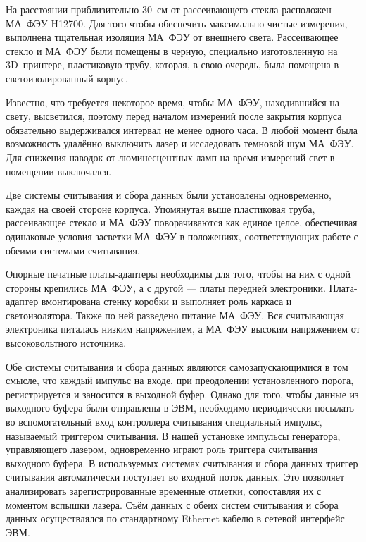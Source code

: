 На расстоянии приблизительно 30~см от рассеивающего стекла расположен МА~ФЭУ H12700. Для того чтобы обеспечить максимально чистые измерения, выполнена тщательная изоляция МА~ФЭУ от внешнего света. Рассеивающее стекло и МА~ФЭУ были помещены в черную, специально изготовленную на 3D~принтере, пластиковую трубу, которая, в свою очередь, была помещена в светоизолированный корпус.

Известно, что требуется некоторое время, чтобы МА~ФЭУ, находившийся на свету, высветился, поэтому перед началом измерений после закрытия корпуса обязательно выдерживался интервал не менее одного часа. В любой момент была возможность удалённо выключить лазер и исследовать темновой шум МА~ФЭУ. Для снижения наводок от люминесцентных ламп на время измерений свет в помещении выключался.

Две системы считывания и сбора данных были установлены одновременно, каждая на своей стороне корпуса. Упомянутая выше пластиковая труба, рассеивающее стекло и МА~ФЭУ поворачиваются как единое целое, обеспечивая одинаковые условия засветки МА~ФЭУ в положениях, соответствующих работе с обеими системами считывания.

Опорные печатные платы-адаптеры необходимы для того, чтобы на них с одной стороны крепились МА~ФЭУ, а с другой --- платы передней электроники. Плата-адаптер вмонтирована стенку коробки и выполняет роль каркаса и светоизолятора. Также по ней разведено питание МА~ФЭУ. Вся считывающая электроника питалась низким напряжением, а МА~ФЭУ высоким напряжением от высоковольтного источника.

Обе системы считывания и сбора данных являются самозапускающимися в том смысле, что каждый импульс на входе, при преодолении установленного порога, регистрируется и заносится в выходной буфер. Однако для того, чтобы данные из выходного буфера были отправлены в ЭВМ, необходимо периодически посылать во вспомогательный вход контроллера считывания специальный импульс, называемый триггером считывания. В нашей установке импульсы генератора, управляющего лазером, одновременно играют роль триггера считывания выходного буфера. В используемых системах считывания и сбора данных триггер считывания автоматически поступает во входной поток данных. Это позволяет анализировать зарегистрированные временные отметки, сопоставляя их с моментом вспышки лазера. Съём данных с обеих систем считывания и сбора данных осуществлялся по стандартному Ethernet кабелю в сетевой интерфейс ЭВМ.
